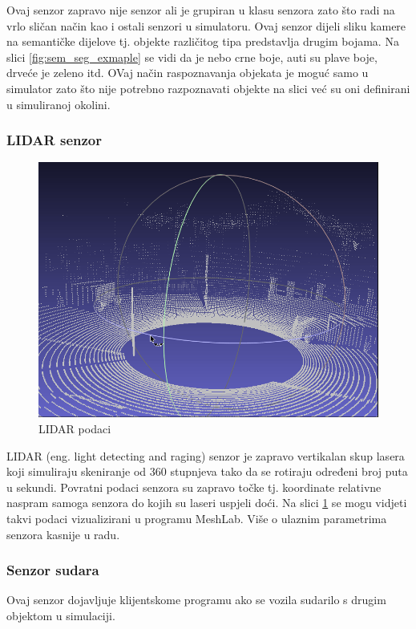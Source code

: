 Ovaj senzor zapravo nije senzor ali je grupiran u klasu senzora zato što radi na vrlo sličan način kao i ostali senzori u simulatoru. Ovaj senzor dijeli sliku kamere na semantičke dijelove tj. objekte različitog tipa predstavlja drugim bojama. Na slici \ref{fig:sem_seg_exmaple} se vidi da je nebo crne boje, auti su plave boje, drveće je zeleno itd. OVaj način raspoznavanja objekata je moguć samo u simulator zato što nije potrebno razpoznavati objekte na slici već su oni definirani u simuliranoj okolini.

\subsubsection{LIDAR senzor}
\begin{figure}[ht!]
  \centering
  \includegraphics[scale=0.5]{images/LIDAR_examaple.png}
  \caption{LIDAR podaci\cite{carla:sensors}}
  \label{fig:lidar_exmaple}
\end{figure}
LIDAR (eng. light detecting and raging) senzor je zapravo vertikalan skup lasera koji simuliraju skeniranje od 360 stupnjeva tako da se rotiraju određeni broj puta u sekundi. Povratni podaci senzora su zapravo točke tj. koordinate relativne naspram samoga senzora do kojih su laseri uspjeli doći. Na slici \ref{fig:lidar_exmaple} se mogu vidjeti takvi podaci vizualizirani u programu MeshLab. Više o ulaznim parametrima senzora kasnije u radu.

\subsubsection{Senzor sudara}
Ovaj senzor dojavljuje klijentskome programu ako se vozila sudarilo s drugim objektom u simulaciji.

